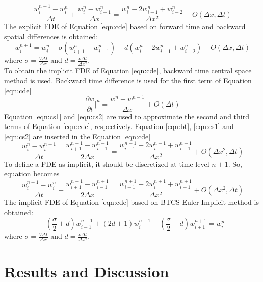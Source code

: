 \documentclass[letterpaper,12pt]{article}
\begin{document}
\begin{equation}
	\frac{w_{i}^{n+1}-{w_{i}^{n}}}{\Delta t}+\frac{w_{i}^{n}-w_{i-1}^{n}}{\Delta x}
	=\frac{w_{i}^{n}-2w_{i-1}^{n}+w_{i-2}^{n}}{\Delta x^2}+O(\Delta x,\Delta t)
\end{equation}
The explicit FDE of Equation \ref{eqn:cde} based on forward time and backward spatial
differences is obtained:
\begin{equation}
	w_{i}^{n+1}= w_{i}^{n}-\sigma(w_{i+1}^{n}-w_{i-1}^{n})+d(w_{i}^{n}-2w_{i-1}^{n}+w_{i-2}^{n})+O(\Delta x,\Delta t)
\end{equation}
where $\sigma = \frac{V\Delta t}{\Delta x }$ and $d = \frac{\nu\Delta t}{\Delta x^2 }$.
\\ To obtain the implicit FDE of Equation \ref{eqn:cde}, backward time central space method is used.
Backward time difference is used for the first term of Equation \ref{eqn:cde}
\begin{equation}
	\frac{\partial w}{\partial t}\vert^{n}=\frac{w^{n}-w^{n-1}}{\Delta x}+O(\Delta t)
	\label{eqn:bt}
\end{equation}
Equation \ref{eqn:cs1} and \ref{eqn:cs2} are used to approximate the second and third
terms of Equation \ref{eqn:cde}, respectively. Equation \ref{eqn:bt}, \ref{eqn:cs1}
and \ref{eqn:cs2} are inserted in the Equation \ref{eqn:cde}
\begin{equation}
	\frac{w_{i}^{n}-{w_{i}^{n-1}}}{\Delta t}+\frac{w_{i+1}^{n-1}-w_{i-1}^{n-1}}{2\Delta x}
	=\frac{w_{i+1}^{n-1}-2w_{i}^{n-1}+w_{i-1}^{n-1}}{\Delta x^2}+O(\Delta x^2, \Delta t)
\end{equation}
To define a PDE as implicit, it should be discretized at time level $n+1$. So, equation becomes
\begin{equation}
	\frac{w_{i}^{n+1}-{w_{i}^{n}}}{\Delta t}+\frac{w_{i+1}^{n+1}-w_{i-1}^{n+1}}{2\Delta x}
	=\frac{w_{i+1}^{n+1}-2w_{i}^{n+1}+w_{i-1}^{n+1}}{\Delta x^2}+O(\Delta x^2, \Delta t)	
\end{equation}
The implicit FDE of Equation \ref{eqn:cde} based on BTCS Euler Implicit method is obtained:
\begin{equation}
	-(\frac{\sigma}{2}+d)w_{i-1}^{n+1}+(2d+1)w_{i}^{n+1}+(\frac{\sigma}{2}-d)w_{i+1}^{n+1} = w_{i}^{n}
\end{equation}
where $\sigma = \frac{V\Delta t}{\Delta x }$ and $d = \frac{\nu\Delta t}{\Delta x^2 }$.
\newpage
\section{Results and Discussion}
\end{document}
